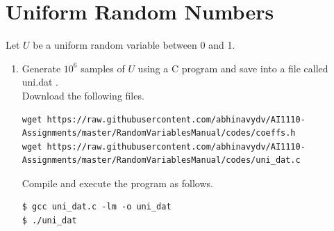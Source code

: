 \documentclass[journal,12pt,twocolumn]{IEEEtran}
\renewcommand\thesection{\arabic{section}}
\begin{document}
\section{Uniform Random Numbers}
Let $U$ be a uniform random variable between 0 and 1.
\begin{enumerate}[label=\thesection.\arabic*
        ,ref=\thesection.\theenumi]
    \item Generate $10^6$ samples of $U$ using a C program and save into a file called uni.dat .\\
          \solution Download the following files.
          \begin{lstlisting}
wget https://raw.githubusercontent.com/abhinavydv/AI1110-Assignments/master/RandomVariablesManual/codes/coeffs.h
wget https://raw.githubusercontent.com/abhinavydv/AI1110-Assignments/master/RandomVariablesManual/codes/uni_dat.c
        \end{lstlisting}

          Compile and execute the program as follows.
          \begin{lstlisting}
$ gcc uni_dat.c -lm -o uni_dat
$ ./uni_dat
        \end{lstlisting}


\end{enumerate}
\end{document}
